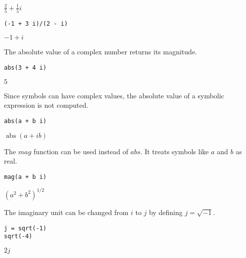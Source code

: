 \noindent
$\tfrac{2}{5}+\frac{1}{5}i$

{\color{blue}
\begin{verbatim}
(-1 + 3 i)/(2 - i)
\end{verbatim}
}

\noindent
$-1+i$

\bigskip
\noindent
The absolute value of a complex number returns its magnitude.

{\color{blue}
\begin{verbatim}
abs(3 + 4 i)
\end{verbatim}
}

\noindent
$5$

\bigskip
\noindent
Since symbols can have complex values, the absolute value
of a symbolic expression is not computed.

{\color{blue}
\begin{verbatim}
abs(a + b i)
\end{verbatim}
}

\noindent
$\operatorname{abs}(a+ib)$

\bigskip
\noindent
The $mag$ function can be used instead of $abs$.
It treats symbols like $a$ and $b$ as real.

{\color{blue}
\begin{verbatim}
mag(a + b i)
\end{verbatim}
}

\noindent
$\displaystyle (a^2+b^2)^{1/2}$

\bigskip
\noindent
The imaginary unit can be changed from $i$ to $j$
by defining $j=\sqrt{-1}$.

{\color{blue}
\begin{verbatim}
j = sqrt(-1)
sqrt(-4)
\end{verbatim}
}

\noindent
$\displaystyle 2j$

